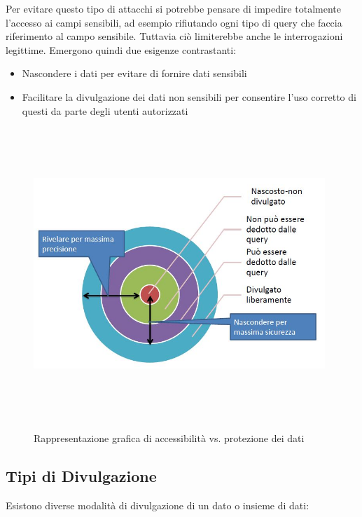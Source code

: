 Per evitare questo tipo di attacchi si potrebbe pensare di impedire totalmente l'accesso ai campi sensibili, ad esempio rifiutando ogni tipo di query che faccia riferimento al campo sensibile. Tuttavia ciò limiterebbe anche le interrogazioni legittime.
Emergono quindi due esigenze contrastanti:

\begin{itemize}
	\item Nascondere i dati per evitare di fornire dati sensibili
	\item Facilitare la divulgazione dei dati non sensibili per consentire l'uso corretto di questi da parte degli utenti autorizzati
	\end{itemize}
	
\begin{figure}[htbp]
	\centering
	{\includegraphics[height=11cm, width=11cm, keepaspectratio]{Immagini/dati_sensibili/prot_dati_03.JPG}}
				\caption{Rappresentazione grafica di accessibilità vs. protezione dei dati \label{fig:protezione_vs_accessibilita}}
\end{figure}

\subsection{Tipi di Divulgazione} 
Esistono diverse modalità di divulgazione di un dato o insieme di dati:

